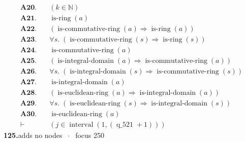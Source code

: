 \documentclass[11pt]{article}
\theoremstyle{plain}
\newcommand{\fit}[1]{\resizebox{\ifdim\width>\linewidth\linewidth\else\width\fi}{!}{#1}}
\begin{document}
\begin{align*}
  \mathbf{A20.}\quad & (k \in \mathbb{N}) \\
  \mathbf{A21.}\quad & \operatorname{is\text{-}ring}(a) \\
  \mathbf{A22.}\quad & (\operatorname{is\text{-}commutative\text{-}ring}(a) \Rightarrow \operatorname{is\text{-}ring}(a)) \\
  \mathbf{A23.}\quad & \forall s.\; (\operatorname{is\text{-}commutative\text{-}ring}(s) \Rightarrow \operatorname{is\text{-}ring}(s)) \\
  \mathbf{A24.}\quad & \operatorname{is\text{-}commutative\text{-}ring}(a) \\
  \mathbf{A25.}\quad & (\operatorname{is\text{-}integral\text{-}domain}(a) \Rightarrow \operatorname{is\text{-}commutative\text{-}ring}(a)) \\
  \mathbf{A26.}\quad & \forall s.\; (\operatorname{is\text{-}integral\text{-}domain}(s) \Rightarrow \operatorname{is\text{-}commutative\text{-}ring}(s)) \\
  \mathbf{A27.}\quad & \operatorname{is\text{-}integral\text{-}domain}(a) \\
  \mathbf{A28.}\quad & (\operatorname{is\text{-}euclidean\text{-}ring}(a) \Rightarrow \operatorname{is\text{-}integral\text{-}domain}(a)) \\
  \mathbf{A29.}\quad & \forall s.\; (\operatorname{is\text{-}euclidean\text{-}ring}(s) \Rightarrow \operatorname{is\text{-}integral\text{-}domain}(s)) \\
  \mathbf{A30.}\quad & \operatorname{is\text{-}euclidean\text{-}ring}(a) \\
  \vdash\quad & (j \in \operatorname{interval}(1, (\operatorname{q\_521} + 1)))
\end{align*}
\medskip\noindent\textbf{125.}\quad \fit{\texttt{(ass)}}\hfill{\small adds no nodes $\;\cdot\;$ focus 250}\\[2pt]
\end{document}

